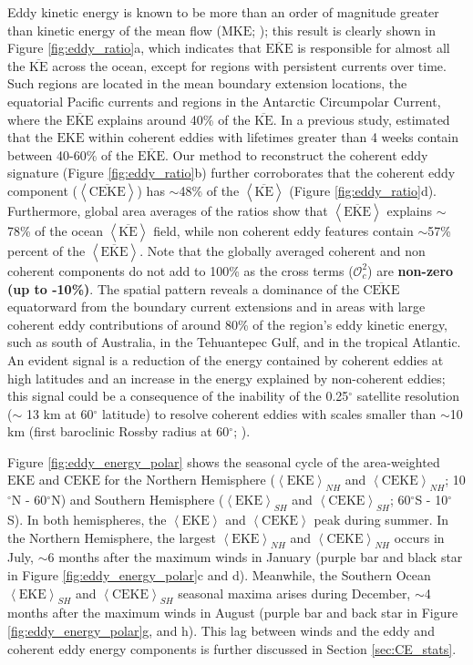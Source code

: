 \documentclass[draft,linenumbers]{agujournal2019}
\newcommand{\MKE}{\overline{\textrm{KE}}}
\newcommand{\mKE}{\textrm{MKE}}
\newcommand{\MEKE}{\overline{\textrm{EKE}}}
\newcommand{\EKE}{\textrm{EKE}}
\newcommand{\MCEKE}{\overline{\textrm{CEKE}}}
\newcommand{\CEKE}{\textrm{CEKE}}
\begin{document}
	Eddy kinetic energy is known to be more than an order of magnitude greater than kinetic energy of the mean flow ($\mKE$; \citealp{Gill_Energy_1974}); this result is clearly shown in Figure \ref{fig:eddy_ratio}a, which indicates that $\MEKE$ is responsible for almost all the $\MKE$ across the ocean, except for regions with persistent currents over time. 
	Such regions are located in the mean boundary extension locations, the equatorial Pacific currents and regions in the Antarctic Circumpolar Current, where the $\MEKE$ explains around 40\% of the $\MKE$. 
	In a previous study, \citet{Chelton_The_2011} estimated that the $\EKE$ within coherent eddies with lifetimes greater than 4 weeks contain between 40-60\% of the $\MEKE$. 
	Our method to reconstruct the coherent eddy signature (Figure \ref{fig:eddy_ratio}b) further corroborates that the coherent eddy component ($\left<\MCEKE\right>$) has $\sim$48\% of the $\left<\MKE\right>$ (Figure \ref{fig:eddy_ratio}d). 
	Furthermore, global area averages of the ratios show that $\left<\MEKE\right>$ explains $\sim$78\% of the ocean $\left<\MKE\right>$ field, while non coherent eddy features contain $\sim$57\% percent of the $\left<\MEKE\right>$. 
	Note that the globally averaged coherent and non coherent components do not add to 100\% as the cross terms ($\mathcal{O}_c^2$) are \textbf{non-zero (up to -10\%)}.
	The spatial pattern reveals a dominance of the $\MCEKE$ equatorward from the boundary current extensions and in areas with large coherent eddy contributions of around 80\% of the region's eddy kinetic energy, such as south of Australia, in the Tehuantepec Gulf, and in the tropical Atlantic. 
	An evident signal is a reduction of the energy contained by coherent eddies at high latitudes and an increase in the energy explained by non-coherent eddies; this signal could be a consequence of the inability of the 0.25$^\circ$ satellite resolution ($\sim$ 13 km at 60$^\circ$ latitude) to resolve coherent eddies with scales smaller than $\sim$10 km (first baroclinic Rossby radius at 60$^\circ$; \citealp{Chelton_Geographical_1998}).


	Figure \ref{fig:eddy_energy_polar} shows the seasonal cycle of the area-weighted $\EKE$ and $\CEKE$ for the Northern Hemisphere ($\left< \EKE\right>_{NH}$ and $\left< \CEKE\right>_{NH}$; 10$^\circ$N - 60$^\circ$N) and Southern Hemisphere ($\left< \EKE\right>_{SH}$  and $\left< \CEKE\right>_{SH}$; 60$^\circ$S - 10$^\circ$S). 
	In both hemispheres, the $\left<\EKE\right>$ and $\left<\CEKE\right>$ peak during summer. In the Northern Hemisphere, the largest $\left<\EKE\right>_{NH}$ and $\left<\CEKE\right>_{NH}$ occurs in July, $\sim$6 months after the maximum winds in January (purple bar and black star in Figure \ref{fig:eddy_energy_polar}c and d). Meanwhile, the Southern Ocean 
	$\left<\EKE\right>_{SH}$ and $\left<\CEKE\right>_{SH}$ seasonal maxima arises during December, $\sim$4 months after the maximum winds in August (purple bar and back star in Figure \ref{fig:eddy_energy_polar}g, and h). This lag between winds and the eddy and coherent eddy energy components is further discussed in Section \ref{sec:CE_stats}.
\end{document}
